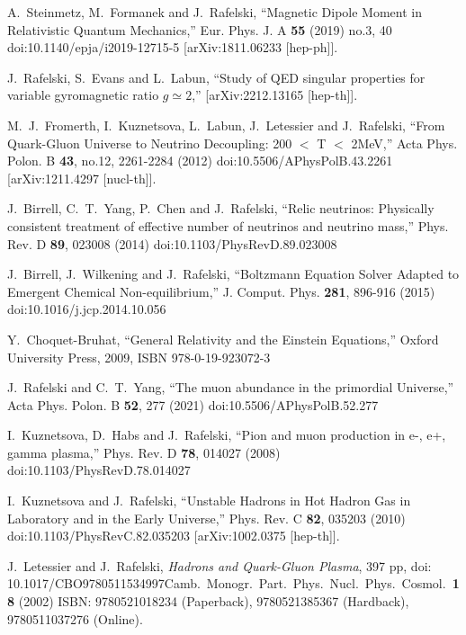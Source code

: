 \begin{thebibliography}{99}
A.~Steinmetz, M.~Formanek and J.~Rafelski,
``Magnetic Dipole Moment in Relativistic Quantum Mechanics,''
Eur. Phys. J. A \textbf{55} (2019) no.3, 40
doi:10.1140/epja/i2019-12715-5
[arXiv:1811.06233 [hep-ph]].

J.~Rafelski, S.~Evans and L.~Labun,
``Study of QED singular properties for variable gyromagnetic ratio $g\simeq 2$,''
[arXiv:2212.13165 [hep-th]].


M.~J.~Fromerth, I.~Kuznetsova, L.~Labun, J.~Letessier and J.~Rafelski,
``From Quark-Gluon Universe to Neutrino Decoupling: 200 \ensuremath{<} T \ensuremath{<} 2MeV,''
Acta Phys. Polon. B \textbf{43}, no.12, 2261-2284 (2012)
doi:10.5506/APhysPolB.43.2261
[arXiv:1211.4297 [nucl-th]].

J.~Birrell, C.~T.~Yang, P.~Chen and J.~Rafelski,
``Relic neutrinos: Physically consistent treatment of effective number of neutrinos and neutrino mass,''
Phys. Rev. D \textbf{89}, 023008 (2014)
doi:10.1103/PhysRevD.89.023008


J.~Birrell, J.~Wilkening and J.~Rafelski,
``Boltzmann Equation Solver Adapted to Emergent Chemical Non-equilibrium,''
J. Comput. Phys. \textbf{281}, 896-916 (2015)
doi:10.1016/j.jcp.2014.10.056

Y.~Choquet-Bruhat,
``General Relativity and the Einstein Equations,''
Oxford University Press, 2009,
ISBN 978-0-19-923072-3

J.~Rafelski and C.~T.~Yang,
``The muon abundance in the primordial Universe,''
Acta Phys. Polon. B \textbf{52}, 277 (2021)
doi:10.5506/APhysPolB.52.277

I.~Kuznetsova, D.~Habs and J.~Rafelski,
``Pion and muon production in e-, e+, gamma plasma,''
Phys. Rev. D \textbf{78}, 014027 (2008)
doi:10.1103/PhysRevD.78.014027

I.~Kuznetsova and J.~Rafelski,
``Unstable Hadrons in Hot Hadron Gas in Laboratory and in the Early Universe,''
Phys. Rev. C \textbf{82}, 035203 (2010)
doi:10.1103/PhysRevC.82.035203
[arXiv:1002.0375 [hep-th]].

J.~Letessier and J.~Rafelski,
\emph{Hadrons and Quark-Gluon Plasma}, 
397 pp, doi: {10.1017/CBO9780511534997}{Camb.\ Monogr.\ Part.\ Phys.\ Nucl.\ Phys.\ Cosmol.\ {\bf 18} (2002)}
ISBN: 9780521018234 (Paperback), 9780521385367 (Hardback), 9780511037276 (Online).


\end{thebibliography}

